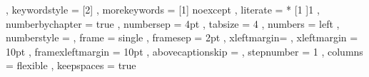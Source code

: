 {,	keywordstyle     = [2]\lst@ifdisplaystyle\color{msvc_stl}\fi
,   morekeywords     = [1]{ noexcept }
,	literate         = *
			{[}{{\lst@ifdisplaystyle\color{msvc_operators}\fi{[}}}{1}
            {]}{{\lst@ifdisplaystyle\color{msvc_operators}\fi{]}}}{1}
%
,   numberbychapter  = true
,   numbersep        =  4pt
,   tabsize          =  4          
,   numbers          = left
,   numberstyle      = \tiny\color{msvc_linenumber}\noncopynumber
,   frame            = single
,   framesep         =  2pt
,   xleftmargin=\parindent
,   xleftmargin      = 10pt
,   framexleftmargin = 10pt
,   abovecaptionskip = \medskipamount
,   stepnumber       = 1
,   columns          = flexible
,   keepspaces       = true
}
